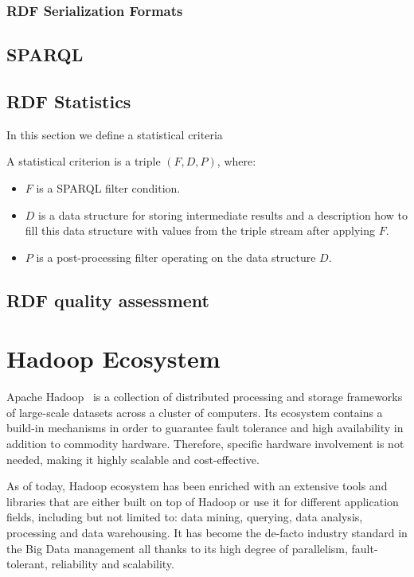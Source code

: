 \subsubsection{RDF Serialization Formats}

\subsection{SPARQL}

\subsection{RDF Statistics}
In this section we define a statistical criteria
\begin{definition}\cite{demter-2012-ekaw}
\label{def:preliminaries-statistics}
A statistical criterion is a triple $(F,D,P)$, where: \vspace{-5pt}
\begin{itemize}
	\item $F$ is a SPARQL filter condition.
	\item $D$ is a data structure for storing intermediate results and a description how to fill this data structure with values from the triple stream after applying $F$.
	\item $P$ is a post-processing filter operating on the data structure $D$.
\end{itemize} \vspace{-5pt}
\end{definition}

\subsection{RDF quality assessment}

\section{Hadoop Ecosystem}
\label{sec:preliminaries-distributed-frameworks}
Apache Hadoop~\cite{White:2015:HDG:2904397} is a collection of distributed processing and storage frameworks of large-scale datasets across a cluster of computers.
Its ecosystem contains a build-in mechanisms in order to guarantee fault tolerance and high availability in addition to commodity hardware.
Therefore, specific hardware involvement is not needed, making it highly scalable and cost-effective.

As of today, Hadoop ecosystem has been enriched with an extensive tools and libraries that are either built on top of Hadoop or use it for different application fields, including but not limited to: data mining, querying, data analysis, processing and data warehousing.
It has become the de-facto industry standard in the Big Data management all thanks to its high degree of parallelism, fault-tolerant, reliability and scalability.

